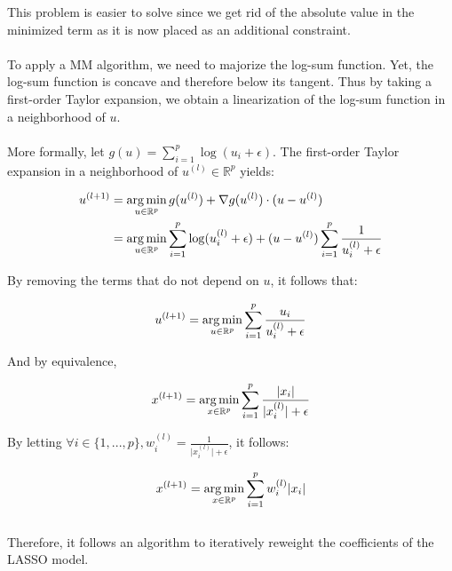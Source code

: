 \documentclass[a4paper,10pt]{article}
\theoremstyle{definition}
\begin{document}
This problem is easier to solve since we get rid of the absolute value in the minimized term as it is now placed as an additional constraint.
\\
\\
To apply a MM algorithm, we need to majorize the log-sum function. Yet, the log-sum function is concave and therefore below its tangent. Thus by taking a first-order Taylor expansion, we obtain a linearization of
the log-sum function in a neighborhood of $u$.
\\
\\
More formally, let $g(u) = \sum_{i=1}^p \log(u_i + \epsilon)$. The first-order Taylor expansion in a neighborhood of $u^{(l)} \in \mathbb{R}^p$ yields:

\begin{align*}
    u^{(l+1)} &= \operatorname*{arg\,min}_{u \in \mathbb{R}^p} g(u^{(l)}) + \nabla g(u^{(l)})\cdot (u - u^{(l)}) \\
              &= \operatorname*{arg\,min}_{u \in \mathbb{R}^p} \sum_{i=1}^p \log( u_i^{(l)} + \epsilon) + (u - u^{(l)}) \sum_{i=1}^p \frac{1}{ u_i^{(l)}  + \epsilon}
\end{align*}

By removing the terms that do not depend on $u$, it follows that:

\begin{equation*}
    u^{(l+1)} = \operatorname*{arg\,min}_{u \in \mathbb{R}^p} \sum_{i=1}^p \frac{u_i}{ u_i^{(l)} + \epsilon}
\end{equation*}

And by equivalence,

\begin{equation*}
    x^{(l+1)} = \operatorname*{arg\,min}_{x \in \mathbb{R}^p} \sum_{i=1}^p \frac{\lvert x_i \rvert}{\lvert x_i^{(l)} \rvert + \epsilon}
\end{equation*}

By letting $\forall i \in \{1, ..., p\}, w_i^{(l)} = \frac{1}{\lvert x_i^{(l)}\rvert + \epsilon}$, it follows:

\begin{equation*}
    x^{(l+1)} = \operatorname*{arg\,min}_{x \in \mathbb{R}^p} \sum_{i=1}^p w_i^{(l)} \lvert x_i \rvert
\end{equation*}
\\
Therefore, it follows an algorithm to iteratively reweight the coefficients of the LASSO model.

\vskip 0.2in
\end{document}
